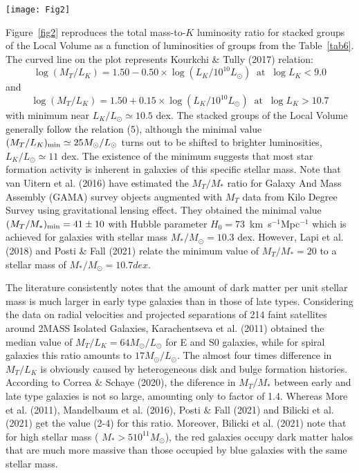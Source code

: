 \documentclass[proof]{WileyASNA-v1}
\begin{document}
\begin{figure*}[t]
\centerline{\texttt{[image: Fig2]}}
\caption{Relation between orbital mass and $K$ luminosity for stacked groups in
the Local Volume. The curved line reflects the relation obtained by Kourkchi
\& Tully (2017).\label{fig2}}
\end{figure*}

Figure~\ref{fig2} reproduces the total mass-to-$K$ luminosity ratio for stacked
groups of the Local Volume as a function of luminosities of groups from the
Table~\ref{tab6}. The curved line on the plot represents Kourkchi \& Tully
(2017) relation:
\begin{equation}
\log(M_T/L_K)=1.50-0.50\times \log(L_K/10^{10}L_{\odot}) \; \; \mbox {at} \; \;\log L_K<9.0
\end{equation}
and
$$\log(M_T/L_K)=1.50+0.15\times \log(L_K/10^{10}L_{\odot}) \; \; \mbox {at} \; \;\log L_K>10.7 $$
with minimum near $L_K/L_{\odot}\simeq10.5$ dex. The stacked groups of the Local
Volume generally follow the relation (5), although the minimal value
$(M_T/L_K)_{\rm min}\simeq25M_{\odot}/L_{\odot}$ turns out to be shifted to
brighter luminosities, $L_K/L_{\odot}\simeq11$ dex. The existence of the minimum
suggests that most star formation activity is inherent in galaxies of this
specific stellar mass. Note that van Uitern et al. (2016) have estimated the
$M_T/M_*$ ratio for Galaxy And Mass Assembly (GAMA) survey objects augmented
with $M_T$ data from Kilo Degree Survey using gravitational lensing effect. They
obtained the minimal value $(M_T/M_*)_{\rm min} =41\pm10$ with Hubble parameter
$H_0=73$~km~s$^{-1}$Mpc$^{-1}$ which is achieved for galaxies with stellar mass
$M_*/M_{\odot}=10.3$ dex. However, Lapi et al. (2018) and Posti \& Fall (2021)
relate the minimum value of $M_T/M_* = 20$ to a stellar mass of $M_*/M_{\odot}=
10.7 dex$. 

The literature consistently notes that the amount of dark matter per unit
stellar mass is much larger in early type galaxies than in those of late types.
Considering the data on radial velocities and projected separations of 214 faint
satellites around 2MASS Isolated Galaxies, Karachentseva et al. (2011) obtained
the median value of $M_T/L_K=64 M_{\odot}/L_{\odot}$ for E and S0 galaxies,
while for spiral galaxies this ratio amounts to $17 M_{\odot}/L_{\odot}$. The
almost four times difference in $M_T/L_K$ is obviously caused by heterogeneous
disk and bulge formation histories. According to Correa \& Schaye (2020), the
diference in $M_T/M_*$ between early and late type galaxies is not so large,
amounting only to factor of 1.4. Whereas More et al. (2011), Mandelbaum et al.
(2016), Posti \& Fall (2021) and Bilicki et al. (2021)  get the value (2-4) for
this ratio. Moreover, Bilicki et al. (2021) note that for high stellar mass (
$M_* > 5 10^{11} M_{\odot}$), the red galaxies occupy dark matter halos that are
much more massive than those occupied by blue galaxies with the same stellar
mass.
\end{document}
